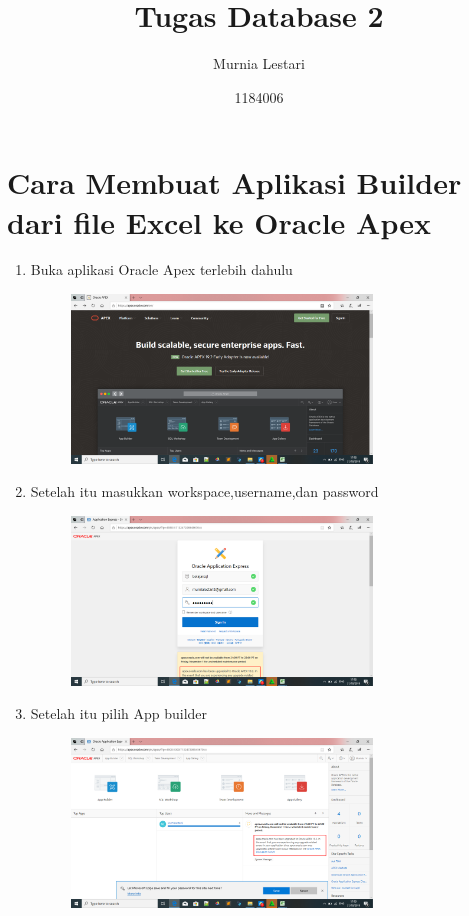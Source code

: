 \documentclass{article}
\title{Tugas Database 2}
\author{Murnia Lestari}
\date{1184006}
\begin{document}
\maketitle
\section{Cara Membuat Aplikasi Builder dari file Excel ke Oracle Apex}
\begin{enumerate}
    \item Buka aplikasi Oracle Apex terlebih dahulu
         \begin{figure}[h]
            \centerline{\includegraphics[width=8cm]{figure/sa.png}}
            \end{figure}
 \item Setelah itu masukkan workspace,username,dan password
         \begin{figure}[h]
    \centerline{\includegraphics[width=8cm]{figure/su.png}}
       \end{figure}
      \newpage \item Setelah itu pilih App builder
    \begin{figure}[h]
    \centerline{\includegraphics[width=8cm]{figure/bi.png}}

\end{figure}
\end{enumerate}
\end{document}

